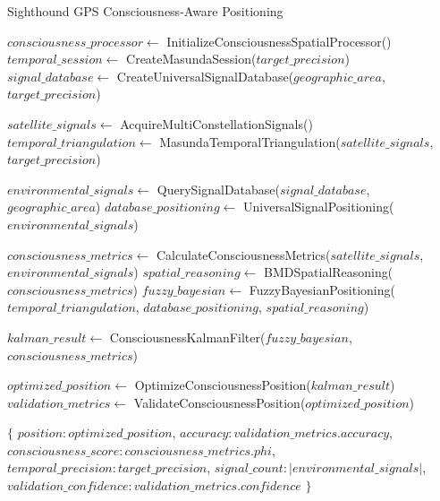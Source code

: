 \documentclass[12pt,a4paper]{article}
\begin{document}
\begin{algorithm}
\caption{Sighthound GPS Consciousness-Aware Positioning}
\begin{algorithmic}[1]
    \State $consciousness\_processor \gets$ InitializeConsciousnessSpatialProcessor()
    \State $temporal\_session \gets$ CreateMasundaSession($target\_precision$)
    \State $signal\_database \gets$ CreateUniversalSignalDatabase($geographic\_area$, $target\_precision$)
    
    \State $satellite\_signals \gets$ AcquireMultiConstellationSignals()
    \State $temporal\_triangulation \gets$ MasundaTemporalTriangulation($satellite\_signals$, $target\_precision$)
    
    \State $environmental\_signals \gets$ QuerySignalDatabase($signal\_database$, $geographic\_area$)
    \State $database\_positioning \gets$ UniversalSignalPositioning($environmental\_signals$)
    
    \State $consciousness\_metrics \gets$ CalculateConsciousnessMetrics($satellite\_signals$, $environmental\_signals$)
    \State $spatial\_reasoning \gets$ BMDSpatialReasoning($consciousness\_metrics$)
    \State $fuzzy\_bayesian \gets$ FuzzyBayesianPositioning($temporal\_triangulation$, $database\_positioning$, $spatial\_reasoning$)
    
    \State $kalman\_result \gets$ ConsciousnessKalmanFilter($fuzzy\_bayesian$, $consciousness\_metrics$)
    
    \State $optimized\_position \gets$ OptimizeConsciousnessPosition($kalman\_result$)
    \State $validation\_metrics \gets$ ValidateConsciousnessPosition($optimized\_position$)
    
    \State \Return $\{$
    \State \quad $position: optimized\_position$,
    \State \quad $accuracy: validation\_metrics.accuracy$,
    \State \quad $consciousness\_score: consciousness\_metrics.phi$,
    \State \quad $temporal\_precision: target\_precision$,
    \State \quad $signal\_count: |environmental\_signals|$,
    \State \quad $validation\_confidence: validation\_metrics.confidence$
    \State $\}$
\EndProcedure
\end{algorithmic}
\end{algorithm}
\end{document}
